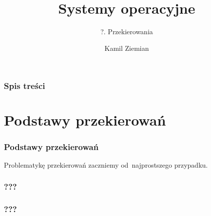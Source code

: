 \documentclass[10pt,t]{beamer}
\title{Systemy operacyjne}
\subtitle{?. Przekierowania}
\author{Kamil Ziemian \\
  \email}
\begin{document}





\RaggedRight





\maketitle





\begin{frame}
  \frametitle{Spis treści}


  \tableofcontents

\end{frame}










\section{Podstawy przekierowań}


\begin{frame}
  \frametitle{Podstawy przekierowań}


  Problematykę przekierowań zaczniemy od~najprostszego przypadku.

\end{frame}





\begin{frame}
  \frametitle{???}


\end{frame}





\begin{frame}
  \frametitle{???}



\end{frame}
\end{document}
